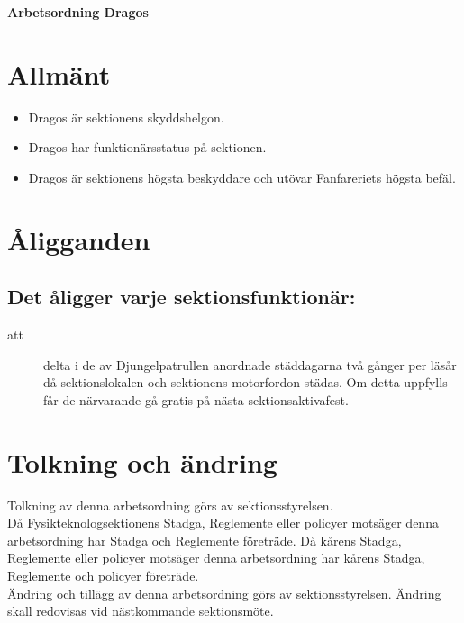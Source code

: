 

\renewcommand{\dateseparator}{-} %

\renewcommand{\forening}{\\Fysikteknologsektionens skyddshelgon, Dragos}

\begin{center}
\LARGE{\textbf{Arbetsordning Dragos}}
\end{center}

\section{Allmänt}
\begin{itemize}
\item Dragos är sektionens skyddshelgon.
\item Dragos har funktionärsstatus på sektionen.
\item Dragos är sektionens högsta beskyddare och utövar Fanfareriets högsta befäl.

\end{itemize}

\section{Åligganden}
\subsection{Det åligger varje sektionsfunktionär:}
    \begin{description}
      \item[att] delta i de av Djungelpatrullen anordnade städdagarna två gånger per
      läsår då sektionslokalen och sektionens motorfordon städas. Om detta uppfylls får de närvarande gå gratis på nästa
      sektionsaktivafest.
    \end{description}

\section{Tolkning och ändring}
Tolkning av denna arbetsordning görs av sektionsstyrelsen.\\ Då Fysikteknologsektionens Stadga, Reglemente eller policyer motsäger denna arbetsordning har Stadga och Reglemente företräde. Då kårens Stadga, Reglemente eller policyer motsäger denna arbetsordning har kårens Stadga, Reglemente och policyer företräde.\\
Ändring och tillägg av denna arbetsordning görs av sektionsstyrelsen. Ändring skall redovisas vid nästkommande sektionsmöte. 

\newpage